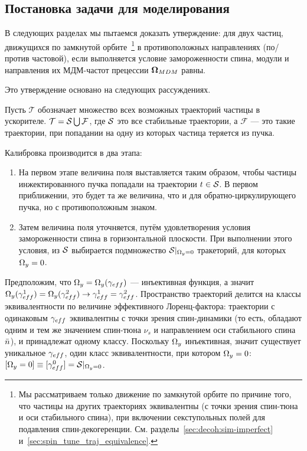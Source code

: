 
\newcommand{\Traj}{\mathcal T}
\newcommand{\Fail}{\mathcal F}
\renewcommand{\D}{\mathcal D}

\subsection{Постановка задачи для моделирования}
В следующих разделах мы пытаемся доказать утверждение: 
для двух частиц, движущихся по замкнутой орбите~\footnote{Мы рассматриваем только движение 
	по замкнутой орбите по причине того, что частицы на других траекториях эквивалентны 
	(с точки зрения спин-тюна и оси стабильного спина), при включении секступольных полей для подавления
	спин-декогеренции. См. разделы~\ref{sec:decoh:sim-imperfect} и~\ref{sec:spin_tune_traj_equivalence}.} 
в противоположных направлениях (по/против частовой), если выполняется условие замороженности спина, 
модули и направления их МДМ-частот прецессии $\boldsymbol{\Omega}_{MDM}$ равны.

Это утверждение основано на следующих рассуждениях.

Пусть $\Traj$ обозначает множество всех возможных траекторий частицы в ускорителе. ${\Traj = \Stab \bigcup \Fail}$,
где $\Stab$ это все стабильные траектории, а $\Fail$ --- это такие траектории,
при попадании на одну из которых частица теряется из пучка.

Калибровка производится в два этапа:
\begin{enumerate}
	\item На первом этапе величина поля выставляется таким образом, чтобы частицы инжектированного пучка
	попадали на траектории ${t\in \Stab}$. В первом приближении, это будет та же величина,
	что и для обратно-циркулирующего пучка, но с противоположным знаком.
	\item Затем величина поля уточняется, путём удовлетворения условия замороженности спина в горизонтальной
	плоскости. При выполнении этого условия, из $\Stab$ выбирается подмножество $\Stab*$ тракеторий, для которых
	${\Omega_y = 0}$.
\end{enumerate}

Предположим, что ${\W_y = \W_y(\g*)}$ --- инъективная функция, а значит
${\W_y(\g*^1) = \W_y(\g*^2) \rightarrow \g*^1 = \g*^2}$. Пространство траекторий делится на
классы эквивалентности по величине эффективного Лоренц-фактора: траектории с одинаковым $\g*$ эквивалентны
с точки зрения спин-динамики (то есть, обладают одним и тем же значением спин-тюна $\nu_s$ и направлением
оси стабильного спина $\bar n$), и принадлежат одному классу. Поскольку $\Omega_y$ инъективная, значит существует
уникальное $\g*$, один класс эквивалентности, при котором $\Omega_y=0$: ${[\W_y=0]\equiv [\g*^0] = \Stab*}$.

